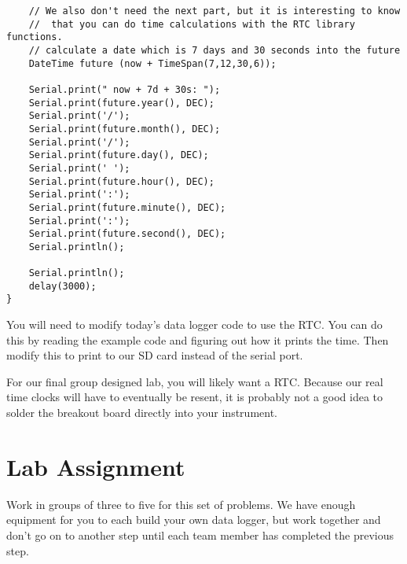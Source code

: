 \begin{verbatim}
    // We also don't need the next part, but it is interesting to know
    //  that you can do time calculations with the RTC library functions.
    // calculate a date which is 7 days and 30 seconds into the future
    DateTime future (now + TimeSpan(7,12,30,6));
    
    Serial.print(" now + 7d + 30s: ");
    Serial.print(future.year(), DEC);
    Serial.print('/');
    Serial.print(future.month(), DEC);
    Serial.print('/');
    Serial.print(future.day(), DEC);
    Serial.print(' ');
    Serial.print(future.hour(), DEC);
    Serial.print(':');
    Serial.print(future.minute(), DEC);
    Serial.print(':');
    Serial.print(future.second(), DEC);
    Serial.println();
    
    Serial.println();
    delay(3000);
}
\end{verbatim}

\bigskip

You will need to modify today's data logger code to use the RTC. You can do this by reading the example code and figuring out how it prints the time. Then modify this to print to our SD card instead of the serial port. 

For our final group designed lab, you will likely want a RTC. Because our real time clocks will have to eventually be resent, it is probably not a good idea to solder the breakout board directly into your instrument.

\section{Lab Assignment}

Work in groups of three to five for this set of problems. We have enough equipment for you to each build your own data logger, but work together and don't go on to another step until each team member has completed the previous step.


